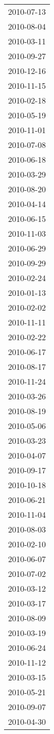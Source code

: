 \begin{tabular}{l}
2010-07-13 \\
2010-08-04 \\
2010-03-11 \\
2010-09-27 \\
2010-12-16 \\
2010-11-15 \\
2010-02-18 \\
2010-05-19 \\
2010-11-01 \\
2010-07-08 \\
2010-06-18 \\
2010-03-29 \\
2010-08-20 \\
2010-04-14 \\
2010-06-15 \\
2010-11-03 \\
2010-06-29 \\
2010-09-29 \\
2010-02-24 \\
2010-01-13 \\
2010-02-02 \\
2010-11-11 \\
2010-02-22 \\
2010-06-17 \\
2010-08-17 \\
2010-11-24 \\
2010-03-26 \\
2010-08-19 \\
2010-05-06 \\
2010-03-23 \\
2010-04-07 \\
2010-09-17 \\
2010-10-18 \\
2010-06-21 \\
2010-11-04 \\
2010-08-03 \\
2010-02-10 \\
2010-06-07 \\
2010-07-02 \\
2010-03-12 \\
2010-03-17 \\
2010-08-09 \\
2010-03-19 \\
2010-06-24 \\
2010-11-12 \\
2010-03-15 \\
2010-05-21 \\
2010-09-07 \\
2010-04-30 \\

\end{tabular}
